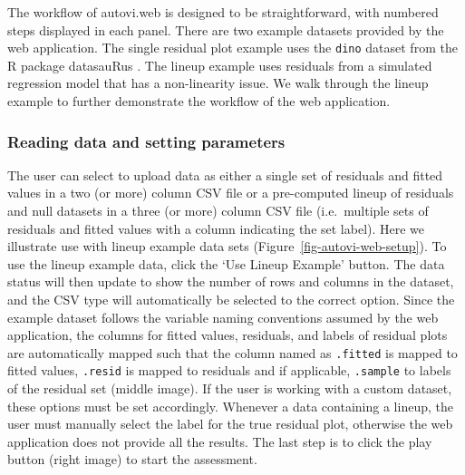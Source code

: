 \documentclass[
doublespace,
  times]{anzsauth}
\begin{document}
The workflow of \textsf{autovi.web} is designed to be straightforward,
with numbered steps displayed in each panel. There are two example
datasets provided by the web application. The single residual plot
example uses the \texttt{dino} dataset from the \textsf{R} package
\textsf{datasauRus} \citep{datasaurus}. The lineup example uses
residuals from a simulated regression model that has a non-linearity
issue. We walk through the lineup example to further demonstrate the
workflow of the web application.

\subsubsection{Reading data and setting
parameters}\label{reading-data-and-setting-parameters}

The user can select to upload data as either a single set of residuals
and fitted values in a two (or more) column CSV file or a pre-computed
lineup of residuals and null datasets in a three (or more) column CSV
file (i.e.~multiple sets of residuals and fitted values with a column
indicating the set label). Here we illustrate use with lineup example
data sets (Figure~\ref{fig-autovi-web-setup}). To use the lineup example
data, click the `Use Lineup Example' button. The data status will then
update to show the number of rows and columns in the dataset, and the
CSV type will automatically be selected to the correct option. Since the
example dataset follows the variable naming conventions assumed by the
web application, the columns for fitted values, residuals, and labels of
residual plots are automatically mapped such that the column named as
\texttt{.fitted} is mapped to fitted values, \texttt{.resid} is mapped
to residuals and if applicable, \texttt{.sample} to labels of the
residual set (middle image). If the user is working with a custom
dataset, these options must be set accordingly. Whenever a data
containing a lineup, the user must manually select the label for the
true residual plot, otherwise the web application does not provide all
the results. The last step is to click the play button (right image) to
start the assessment.
\end{document}
